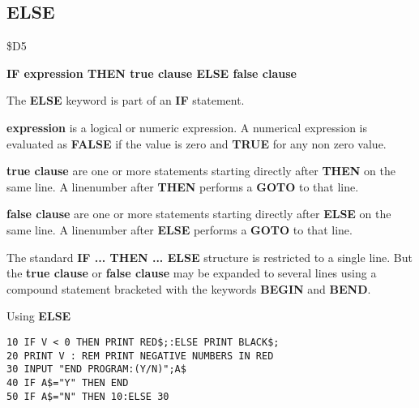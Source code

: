 \subsection{ELSE}
\begin{description}[leftmargin=2cm,style=nextline]
\item [Token:] \$D5
\item [Format:] {\bf IF expression THEN true clause ELSE false clause}
\item [Usage:] The {\bf ELSE} keyword is part of an {\bf IF}
               statement.

               {\bf expression} is a logical or numeric expression.
               A numerical expression is evaluated as {\bf FALSE}
               if the value is zero and {\bf TRUE} for any non zero
               value.

               {\bf true clause} are one or more statements starting
               directly after {\bf THEN} on the same line.
               A linenumber after {\bf THEN} performs a
               {\bf GOTO} to that line.

               {\bf false clause} are one or more statements starting
               directly after {\bf ELSE} on the same line.
               A linenumber after {\bf ELSE} performs a
               {\bf GOTO} to that line.

\item [Remarks:]
               The standard {\bf IF ... THEN ... ELSE} structure
               is restricted to a single line. But the {\bf true clause}
               or {\bf false clause} may be expanded to several lines
               using a compound statement bracketed with the keywords
               {\bf BEGIN} and {\bf BEND}.
\item [Example:]
                Using {\bf ELSE}
\begin{tcolorbox}[colback=black,coltext=white]
\verbatimfont{\codefont}
\begin{verbatim}
10 IF V < 0 THEN PRINT RED$;:ELSE PRINT BLACK$;
20 PRINT V : REM PRINT NEGATIVE NUMBERS IN RED
30 INPUT "END PROGRAM:(Y/N)";A$
40 IF A$="Y" THEN END
50 IF A$="N" THEN 10:ELSE 30
\end{verbatim}
\end{tcolorbox}
\end{description}



\newpage
